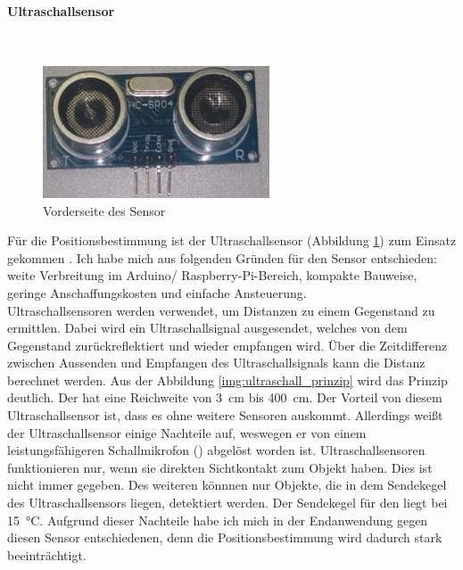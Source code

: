 \paragraph{Ultraschallsensor}\mbox{}\\

\begin{figure}[!ht]
        \centering
        \includegraphics[width=0.6\textwidth]{images/ultraschallsensor.png}
        \caption{Vorderseite des \ultraschall \platz Sensor}
        \label{img:ultraschallsensor}
\end{figure}

Für die Positionsbestimmung ist der Ultraschallsensor \ultraschall \platz (Abbildung \ref{img:ultraschallsensor}) zum Einsatz gekommen \cite{src_HC_SR04}. Ich habe mich aus folgenden Gründen für den \ultraschall \platz Sensor entschieden: weite Verbreitung im Arduino/ Raspberry-Pi-Bereich, kompakte Bauweise, geringe Anschaffungskosten und einfache Ansteuerung.
\\
Ultraschallsensoren werden verwendet, um Distanzen zu einem Gegenstand zu ermittlen. Dabei wird ein Ultraschallsignal ausgesendet, welches von dem Gegenstand zurückreflektiert und wieder empfangen wird. Über die Zeitdifferenz zwischen Aussenden und Empfangen des Ultraschallsignals kann die Distanz berechnet werden. Aus der Abbildung \ref{img:ultraschall_prinzip} wird das Prinzip deutlich. Der \ultraschall \platz  hat eine Reichweite von \SI{3}{\centi \metre} bis \SI{400}{\centi \metre}. Der Vorteil von diesem Ultraschallsensor ist, dass es ohne weitere Sensoren auskommt. Allerdings weißt der Ultraschallsensor einige Nachteile auf, weswegen er von einem leistungsfähigeren Schallmikrofon (\microphone) abgelöst worden ist. Ultraschallsensoren funktionieren nur, wenn sie direkten Sichtkontakt zum Objekt haben. Dies ist nicht immer gegeben. Des weiteren könnnen nur Objekte, die in dem Sendekegel des Ultraschallsensors liegen, detektiert werden. Der Sendekegel für den \ultraschall \platz liegt bei \SI{15}{\degreeCelsius}. Aufgrund dieser Nachteile habe ich mich in der Endanwendung gegen diesen Sensor entschiedenen, denn die Positionsbestimmung wird dadurch stark beeinträchtigt.

